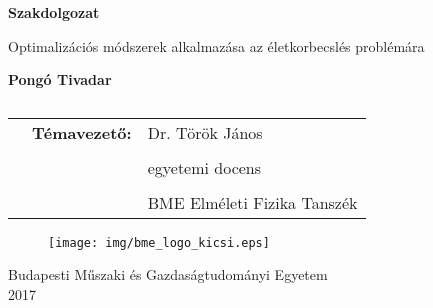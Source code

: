 \documentclass[12pt]{article}
\begin{document}

\begin{titlepage}
	\centering
	{\Huge\bfseries Szakdolgozat\par}
	\vspace{1cm}
	\vspace{1cm}
	{\LARGE Optimalizációs módszerek alkalmazása
		az életkorbecslés problémára \par} %
	\vspace{3cm}
	{\huge\bfseries Pongó Tivadar\\\par}
	\vspace{3cm}
	\begin{table}[H]
		\centering
		\begin{tabular}{ccl}
			&	\LARGE\textbf{Témavezető:} &\Large Dr. Török János \\
			& &\\
			& &\Large egyetemi docens \\
			& &\\
			& &\Large BME Elméleti Fizika Tanszék \\
			
		\end{tabular}
		\caption*{}
		\label{t1}
	\end{table}
	\vfill
	\begin{figure}[H]
		\centering
		\texttt{[image: img/bme\_logo\_kicsi.eps]}
	\end{figure} 
	{\large Budapesti Műszaki és Gazdaságtudományi Egyetem\\ 2017 \par}
\end{titlepage}
\onehalfspacing
\iffalse
\end{document}
